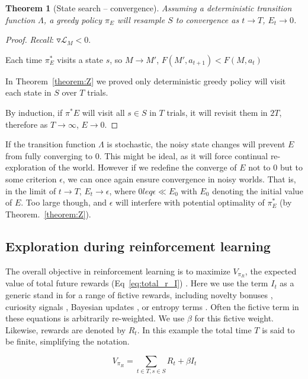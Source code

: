 \documentclass[9pt,twocolumn,twoside]{pnas-new}
\newtheorem{theorem}{Theorem}
\begin{document}
\begin{theorem}[State search -- convergence] \label{theorem:convergence}
    Assuming a deterministic transition function $\Lambda$, a greedy policy $\pi_E$ will resample $S$ to convergence as $t \rightarrow T$, $E_t \rightarrow 0$.
\end{theorem}
\begin{proof}
    \textit{Recall}: $\triangledown \mathcal{L}_M < 0$. 

    Each time $\pi^*_E$ visits a state $s$, so $M \rightarrow M'$, $F(M', a_{t+1}) < F(M, a_t)$

    In Theorem~\ref{theorem:Z} we proved only deterministic greedy policy will visit each state in $S$ over $T$ trials.
    
    By induction, if $\pi^*E$ will visit all $s \in S$ in $T$ trials, it will revisit them in $2T$, therefore as $T \rightarrow \infty$, $E \rightarrow 0$. 
\end{proof}

If the transition function $\Lambda$ is stochastic, the noisy state changes will prevent $E$ from fully converging to 0. This might be ideal, as it will force continual re-exploration of the world. However if we redefine the converge of $E$ not to 0 but to some criterion $\epsilon$, we can once again ensure convergence in noisy worlds. That is, in the limit of $t \rightarrow T$, $E_t \rightarrow \epsilon$, where $0 leq \epsilon \ll E_0$ with $E_0$ denoting the initial value of $E$. Too large though, and $\epsilon$ will interfere with potential optimality of $\pi^*_E$ (by Theorem.~\ref{theorem:Z}). 


\subsection*{Exploration during reinforcement learning}
The overall objective in reinforcement learning is to maximize $V_{\pi_R}$, the expected value of total future rewards (Eq~\ref{eq:total_r_I}) \cite{Sutton2018}. Here we use the term $I_t$ as a generic stand in for a range of fictive rewards, including novelty bonuses \cite{Kakade2002}, curiosity signals \cite{Pathak2017}, Bayesian updates \cite{Radulescu2019}, or entropy terms \cite{Haarnoja2015,Haarnoja2017}.  Often the fictive term in these equations is arbitrarily re-weighted. We use $\beta$ for this fictive weight. Likewise, rewards are denoted by $R_t$. In this example the total time $T$ is said to be finite, simplifying the notation.

\begin{equation}
    V_{\pi_R} = \sum_{t \in T, s \in S} R_t + \beta I_t
    \label{eq:total_r_I}
\end{equation}
\end{document}
